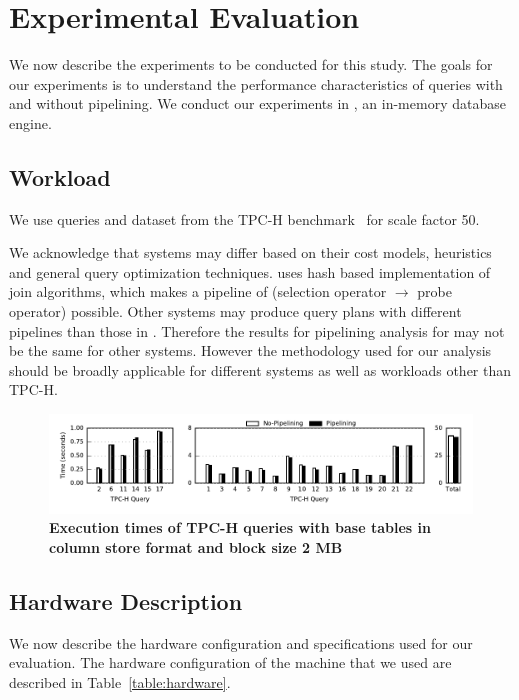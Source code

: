 \section{Experimental Evaluation}\label{sec:experiments}
We now describe the experiments to be conducted for this study.
The goals for our experiments is to understand the performance characteristics of queries with and without pipelining. 
We conduct our experiments in \sys{}, an in-memory database engine. 

\subsection{Workload}
We use queries and dataset from the TPC-H benchmark~\cite{tpc-h} for scale factor 50.


We acknowledge that systems may differ based on their cost models, heuristics and general query optimization techniques.
\sys{} uses hash based implementation of join algorithms, which makes a pipeline of (selection operator $\rightarrow$ probe operator) possible. 
Other systems may produce query plans with different pipelines than those in \sys{}. 
Therefore the results for pipelining analysis for \sys{} may not be the same for other systems.
However the methodology used for our analysis should be broadly applicable for different systems as well as workloads other than TPC-H. 

\begin{figure}[ht]
	\centering 
	\includegraphics{pipeline/figures/colstore-20threads-bs2mb-withlip-alltpch}
	\caption{\textbf{Execution times of TPC-H queries with base tables in column store format and block size 2 MB}}
	\label{fig:absolute-times-all-tpch-bs2mb-20threads}
\end{figure}

\subsection{Hardware Description}\label{ssec:hardware-description}
We now describe the hardware configuration and \sys{} specifications used for our evaluation. 
The hardware configuration of the machine that we used are described in Table~\ref{table:hardware}.

